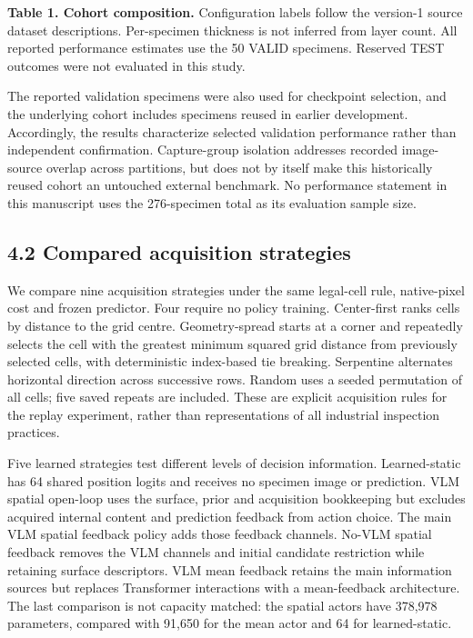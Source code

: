 \textbf{Table 1. Cohort composition.} Configuration labels follow the version-1 source dataset descriptions. Per-specimen thickness is not inferred from layer count. All reported performance estimates use the 50 VALID specimens. Reserved TEST outcomes were not evaluated in this study.

The reported validation specimens were also used for checkpoint selection, and the underlying cohort includes specimens reused in earlier development. Accordingly, the results characterize selected validation performance rather than independent confirmation. Capture-group isolation addresses recorded image-source overlap across partitions, but does not by itself make this historically reused cohort an untouched external benchmark. No performance statement in this manuscript uses the 276-specimen total as its evaluation sample size.

\hypertarget{compared-acquisition-strategies}{%
\subsection{4.2 Compared acquisition strategies}\label{compared-acquisition-strategies}}

We compare nine acquisition strategies under the same legal-cell rule, native-pixel cost and frozen predictor. Four require no policy training. Center-first ranks cells by distance to the grid centre. Geometry-spread starts at a corner and repeatedly selects the cell with the greatest minimum squared grid distance from previously selected cells, with deterministic index-based tie breaking. Serpentine alternates horizontal direction across successive rows. Random uses a seeded permutation of all cells; five saved repeats are included. These are explicit acquisition rules for the replay experiment, rather than representations of all industrial inspection practices.

Five learned strategies test different levels of decision information. Learned-static has 64 shared position logits and receives no specimen image or prediction. VLM spatial open-loop uses the surface, prior and acquisition bookkeeping but excludes acquired internal content and prediction feedback from action choice. The main VLM spatial feedback policy adds those feedback channels. No-VLM spatial feedback removes the VLM channels and initial candidate restriction while retaining surface descriptors. VLM mean feedback retains the main information sources but replaces Transformer interactions with a mean-feedback architecture. The last comparison is not capacity matched: the spatial actors have 378,978 parameters, compared with 91,650 for the mean actor and 64 for learned-static.


